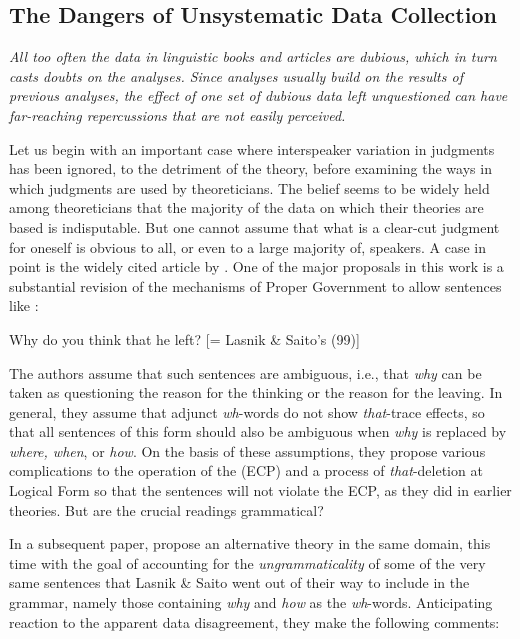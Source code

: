 \subsection{The Dangers of Unsystematic Data Collection} \label{sec:2.3.2}

\epigraph{\itshape All too often the data in linguistic books and articles are dubious, which in turn casts doubts on the analyses. Since analyses usually build on the results of previous analyses, the effect of one set of dubious data left unquestioned can have far-reaching repercussions that are not easily perceived.\\[-2\baselineskip]}{\citep{Greenbaum1977c}}

\noindent Let us begin with an important case where interspeaker variation in judgments has been ignored, to the detriment of the theory, before examining the ways in which judgments are used by theoreticians. The belief seems to be widely held among theoreticians that the majority of the data on which their theories are based is indisputable. But one cannot assume that what is a clear-cut judgment for oneself is obvious to all, or even to a large majority of, speakers. A case in point is the widely cited article by \citet{LasnikEtAl1984}. One of the major proposals in this work is a substantial revision of the mechanisms of Proper Government to allow sentences like :

\ea\label{ex:2:5}
Why do you think that he left?  [= Lasnik \& Saito's (99)]
\z

\noindent
The authors assume that such sentences are ambiguous, i.e., that \textit{why} can be taken as questioning the reason for the thinking or the reason for the leaving. In general, they assume that adjunct \textit{wh}-words do not show \textit{that}-trace effects, so that all sentences of this form should also be ambiguous when \textit{why} is replaced by \textit{where, when}, or \textit{how}. On the basis of these assumptions, they propose various complications to the operation of the  (ECP) and a process of \textit{that}-deletion at Logical Form so that the sentences will not violate the ECP, as they did in earlier theories. But are the crucial readings grammatical?

In a subsequent paper, \citet{AounEtAl1987} propose an alternative theory in the same domain, this time with the goal of accounting for the \textit{ungrammaticality} of some of the very same sentences that Lasnik \& Saito went out of their way to include in the grammar, namely those containing \textit{why} and \textit{how} as the \textit{wh}-words. Anticipating reaction to the apparent data disagreement, they make the following comments:

